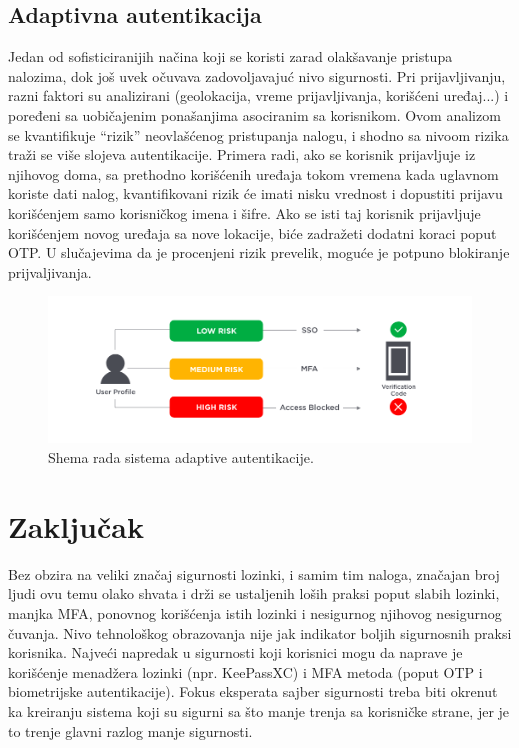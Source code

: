\documentclass[fleqn, 12pt]{article}
\begin{document}
\subsection{Adaptivna autentikacija}
\indent Jedan od sofisticiranijih načina koji se koristi zarad olakšavanje pristupa nalozima, dok još uvek očuvava zadovoljavajuć nivo sigurnosti. Pri prijavljivanju, razni faktori su analizirani (geolokacija, vreme prijavljivanja, korišćeni uređaj...) i poređeni sa uobičajenim ponašanjima asociranim sa korisnikom. Ovom analizom se kvantifikuje ``rizik'' neovlašćenog pristupanja nalogu, i shodno sa nivoom rizika traži se više slojeva autentikacije. Primera radi, ako se korisnik prijavljuje iz njihovog doma, sa prethodno korišćenih uređaja tokom vremena kada uglavnom koriste dati nalog, kvantifikovani rizik će imati nisku vrednost i dopustiti prijavu korišćenjem samo korisničkog imena i šifre. Ako se isti taj korisnik prijavljuje korišćenjem novog uređaja sa nove lokacije, biće zadražeti dodatni koraci poput OTP. U slučajevima da je procenjeni rizik prevelik, moguće je potpuno blokiranje prijvaljivanja. \cite{adaptive}

\begin{figure}[H]
    \centering
    \includegraphics[width=0.8\linewidth]{Adaptive.png}
    \caption{Shema rada sistema adaptive autentikacije.\cite{adaptive}}
    \label{fig:enter-label}
\end{figure}

\newpage
\section{Zaključak}
\indent Bez obzira na veliki značaj sigurnosti lozinki, i samim tim naloga, značajan broj ljudi ovu temu olako shvata i drži se ustaljenih loših praksi poput slabih lozinki, manjka MFA, ponovnog korišćenja istih lozinki i nesigurnog njihovog nesigurnog čuvanja. Nivo tehnološkog obrazovanja nije jak indikator boljih sigurnosnih praksi korisnika. Najveći napredak u sigurnosti koji korisnici mogu da naprave je korišćenje menadžera lozinki (npr. KeePassXC) i MFA metoda (poput OTP i biometrijske autentikacije). Fokus eksperata sajber sigurnosti treba biti okrenut ka kreiranju sistema koji su sigurni sa što manje trenja sa korisničke strane, jer je to trenje glavni razlog manje sigurnosti. 

\end{document}
